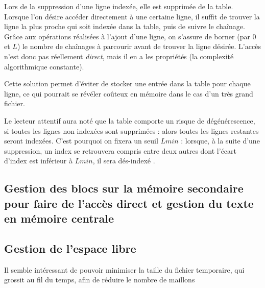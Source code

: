 Lors de la suppression d'une ligne indexée, elle est supprimée de la table.\\

Lorsque l'on désire accéder directement à une certaine ligne, il suffit de trouver la ligne la plus proche qui soit indexée dans la table, puis de suivre le chaînage. Grâce aux opérations réalisées à l'ajout d'une ligne, on s'assure de borner (par $0$ et $L$) le nombre de chaînages à parcourir avant de trouver la ligne désirée. L'accès n'est donc pas réellement \emph{direct}, mais il en a les propriétés (la complexité algorithmique constante).

Cette solution permet d'éviter de stocker une entrée dans la table pour chaque ligne, ce qui pourrait se révéler coûteux en mémoire dans le cas d'un très grand fichier. 

Le lecteur attentif aura noté que la table comporte un risque de dégénérescence, si toutes les lignes non indexées sont supprimées : alors toutes les lignes restantes seront indexées. C'est pourquoi on fixera un seuil $Lmin$ : lorsque, à la suite d'une suppression, un index se retrouvera compris entre deux autres dont l'écart d'index est inférieur à $Lmin$, il sera \og dés-indexé \fg. 


\subsection{Gestion des blocs sur la mémoire secondaire pour faire de l'accès
    direct et gestion du texte en mémoire centrale}
	\label{subsec:gestionblocs}

\subsection{Gestion de l'espace libre}
	\label{subsec:gestionespacelibre}
Il semble intéressant de pouvoir minimiser la taille du fichier temporaire, qui
grossit au fil du temps, afin de réduire le nombre de maillons

